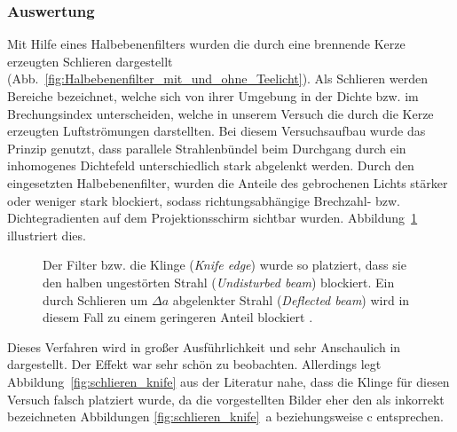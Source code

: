 \subsubsection*{Auswertung}
% 

Mit Hilfe eines Halbebenenfilters wurden die durch eine brennende Kerze erzeugten Schlieren dargestellt (Abb.~\ref{fig:Halbebenenfilter_mit_und_ohne_Teelicht}). Als Schlieren werden Bereiche bezeichnet, welche sich von ihrer Umgebung in der Dichte  bzw. im Brechungsindex unterscheiden, welche in unserem Versuch die durch  die Kerze erzeugten Luftströmungen darstellten. Bei diesem Versuchsaufbau  wurde das Prinzip genutzt, dass parallele Strahlenbündel beim  Durchgang durch ein inhomogenes Dichtefeld unterschiedlich stark abgelenkt werden. Durch den eingesetzten Halbebenenfilter, wurden die Anteile des gebrochenen  Lichts stärker oder weniger stark blockiert, sodass richtungsabhängige Brechzahl- bzw. Dichtegradienten auf dem Projektionsschirm sichtbar wurden. Abbildung~\ref{fig:schlieren_expl} illustriert dies.

\begin{figure}[h]
	\centering
	\caption[Anschauliche Erklärung des Schlierenverfahrens]{
		Der Filter bzw. die Klinge (\textit{Knife edge}) wurde so platziert, dass sie den halben ungestörten Strahl (\textit{Undisturbed beam}) blockiert. Ein durch Schlieren um $\Delta a$ abgelenkter Strahl (\textit{Deflected beam}) wird in diesem Fall zu einem geringeren Anteil blockiert \cite[Fig.~2.5]{panigrahi_schlieren_2012}.
	}
	\label{fig:schlieren_expl}
\end{figure}

Dieses Verfahren wird in großer Ausführlichkeit und sehr Anschaulich in 
\cite[Kapitel~2]{panigrahi_schlieren_2012} dargestellt. Der Effekt war sehr schön zu beobachten. Allerdings legt Abbildung~\ref{fig:schlieren_knife} aus der Literatur \cite[Fig.~2.2]{panigrahi_schlieren_2012} nahe, dass die Klinge für diesen Versuch falsch platziert wurde, da die vorgestellten Bilder eher den als inkorrekt bezeichneten Abbildungen \ref{fig:schlieren_knife}~a beziehungsweise c entsprechen.


